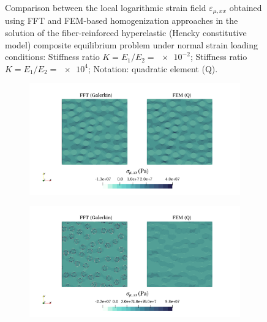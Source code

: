 \begin{figure}[hbt]
\begin{subfigure}[b]{\textwidth}
    \caption{}
    \label{subfig:hencky_2D_ratio_-4_normal_strain_11}
  \end{subfigure}
  \caption{Comparison between the local logarithmic strain field \(\varepsilon_{\mu,xx}\) obtained using
  FFT and FEM-based homogenization approaches in the solution of the fiber-reinforced
  hyperelastic (Hencky constitutive model) composite equilibrium problem under normal strain loading conditions:
   Stiffness ratio \(K=E_1/E_2=\num{e-2}\);
   Stiffness ratio \(K=E_1/E_2=\num{e4}\);
  Notation: quadratic element (Q).}
\label{fig:hencky_2D_stiff_contrast_normal_strain_11}
\end{figure}

\begin{figure}[hbt]
  \centering
	\begin{subfigure}[b]{\textwidth}
    \centering
    \includegraphics[width=\textwidth]{figures/hencky_2D_ratio_-2_normal_stress_11}
    \caption{}
    \label{subfig:hencky_2D_ratio_4_normal_stress_11}
  \end{subfigure}
  \begin{subfigure}[b]{\textwidth}
    \centering
    \includegraphics[width=\textwidth]{figures/hencky_2D_ratio_4_normal_stress_11}

\end{subfigure}
\end{figure}
